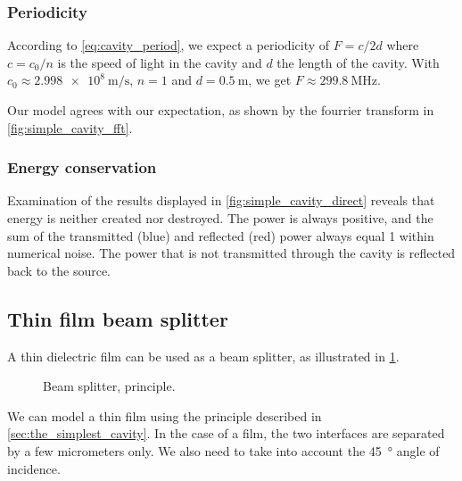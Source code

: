 
\subsubsection{Periodicity}
According to \cref{eq:cavity_period}, we expect a periodicity of $F=c/2d$ where $c=c_0/n$ is the speed of light in the cavity and $d$ the length of the cavity.
With $c_0\approx \SI{2.998e8}{\meter\per\second}$, $n=1$ and $d=\SI{0.5}{\meter}$, we get $F \approx \SI{299.8}{\mega\hertz}$.

Our model agrees with our expectation, as shown by the fourrier transform in \cref{fig:simple_cavity_fft}.




\subsubsection{Energy conservation}
Examination of the results displayed in \cref{fig:simple_cavity_direct} reveals that energy is neither created nor destroyed.
The power is always positive, and the sum of the transmitted (blue) and reflected (red) power always equal 1 within numerical noise.
The power that is not transmitted through the cavity is reflected back to the source.




\subsection{Thin film beam splitter}

A thin dielectric film can be used as a beam splitter, as illustrated in \cref{fig:beam_splitter_principle}.
\begin{figure}[hbtp]
    \centering
    
    \caption{Beam splitter, principle.}
    \label{fig:beam_splitter_principle}
\end{figure}

We can model a thin film using the principle described in \cref{sec:the_simplest_cavity}.
In the case of a film, the two interfaces are separated by a few micrometers only.
We also need to take into account the \SI{45}{\degree} angle of incidence.

